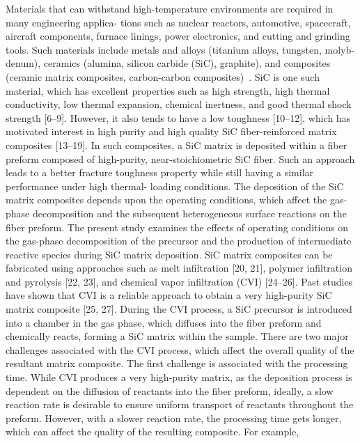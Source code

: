 \documentclass[final, letterpaper, square, comma, numbers, sort&compress]{elsarticle}
\begin{document}
Materials that can withstand high-temperature environments are required in many engineering applica-
tions such as nuclear reactors, automotive, spacecraft, aircraft components, furnace linings, power electronics,
and cutting and grinding tools. Such materials include metals and alloys (titanium alloys, tungsten, molyb-
denum), ceramics (alumina, silicon carbide (SiC), graphite), and composites (ceramic matrix composites,
carbon-carbon composites)~\cite{Meetham1991,Tressler1999,Belmonte2006,Fahrenholtz2014,BarCohen2014}. SiC is one such material, which has excellent properties such as high
strength, high thermal conductivity, low thermal expansion, chemical inertness, and good thermal shock
strength [6–9]. However, it also tends to have a low toughness [10–12], which has motivated interest in high
purity and high quality SiC fiber-reinforced matrix composites [13–19]. In such composites, a SiC matrix is
deposited within a fiber preform composed of high-purity, near-stoichiometric SiC fiber. Such an approach
leads to a better fracture toughness property while still having a similar performance under high thermal-
loading conditions. The deposition of the SiC matrix composites depends upon the operating conditions,
which affect the gas-phase decomposition and the subsequent heterogeneous surface reactions on the fiber
preform. The present study examines the effects of operating conditions on the gas-phase decomposition of
the precursor and the production of intermediate reactive species during SiC matrix deposition.
SiC matrix composites can be fabricated using approaches such as melt infiltration [20, 21], polymer
infiltration and pyrolysis [22, 23], and chemical vapor infiltration (CVI) [24–26]. Past studies have shown
that CVI is a reliable approach to obtain a very high-purity SiC matrix composite [25, 27]. During the CVI
process, a SiC precursor is introduced into a chamber in the gas phase, which diffuses into the fiber preform
and chemically reacts, forming a SiC matrix within the sample. There are two major challenges associated
with the CVI process, which affect the overall quality of the resultant matrix composite. The first challenge
is associated with the processing time. While CVI produces a very high-purity matrix, as the deposition
process is dependent on the diffusion of reactants into the fiber preform, ideally, a slow reaction rate is
desirable to ensure uniform transport of reactants throughout the preform. However, with a slower reaction
rate, the processing time gets longer, which can affect the quality of the resulting composite. For example,
\end{document}
